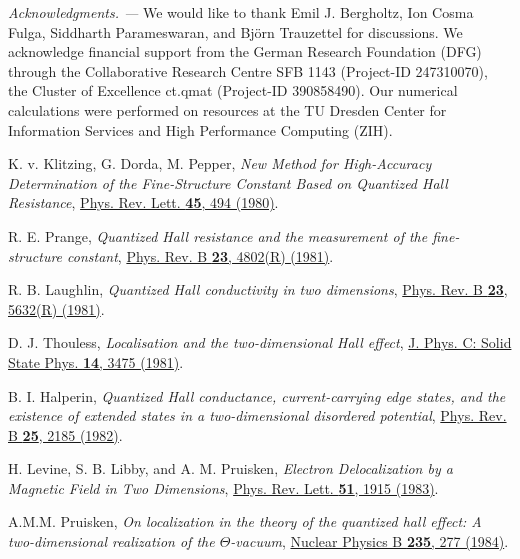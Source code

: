 \documentclass[aps,prl,amsmath,amssymb,twocolumn, superscriptaddress]{revtex4-2}
\begin{document}
{\it Acknowledgments. ---}
We would like to thank Emil J. Bergholtz, Ion Cosma Fulga, Siddharth Parameswaran, and Bj\"orn Trauzettel for discussions. We acknowledge financial support from the German Research Foundation (DFG) through the Collaborative Research Centre SFB 1143  (Project-ID 247310070), the Cluster of Excellence ct.qmat (Project-ID 390858490). Our numerical calculations were performed on resources at the TU Dresden Center for Information Services and High Performance Computing (ZIH).

\begin{thebibliography}{10}
K. v. Klitzing, G. Dorda, M. Pepper, {\em New Method for High-Accuracy Determination of the Fine-Structure Constant Based on Quantized Hall Resistance}, 
\href{https://journals.aps.org/prl/abstract/10.1103/PhysRevLett.45.494}{Phys. Rev. Lett. {\bfseries{45}}, 494 (1980)}.

R. E. Prange, {\em Quantized Hall resistance and the measurement of the fine-structure constant}, \href{https://journals.aps.org/prb/abstract/10.1103/PhysRevB.23.4802}{Phys. Rev. B {\bfseries 23}, 4802(R) (1981)}.

R. B. Laughlin, {\em Quantized Hall conductivity in two dimensions}, \href{https://journals.aps.org/prb/abstract/10.1103/PhysRevB.23.5632}{Phys. Rev. B {\bfseries 23}, 5632(R) (1981)}.

D. J. Thouless, {\em Localisation and the two-dimensional Hall effect}, \href{https://iopscience.iop.org/article/10.1088/0022-3719/14/23/022}{ J. Phys. C: Solid State Phys. {\bfseries 14}, 3475 (1981)}.

B. I. Halperin, {\em Quantized Hall conductance, current-carrying edge states, and the existence of extended states in a two-dimensional disordered potential}, \href{https://journals.aps.org/prb/abstract/10.1103/PhysRevB.25.2185}{Phys. Rev. B {\bfseries 25}, 2185 (1982)}.

H. Levine, S. B. Libby, and A. M. Pruisken, {\em Electron Delocalization by a Magnetic Field in Two Dimensions}, \href{https://journals.aps.org/prl/abstract/10.1103/PhysRevLett.51.1915}{Phys. Rev. Lett. {\bfseries 51}, 1915 (1983)}.

A.M.M. Pruisken, {\em On localization in the theory of the quantized hall effect: A two-dimensional realization of the $\Theta$-vacuum}, \href{https://www.sciencedirect.com/science/article/pii/0550321384901019}{Nuclear Physics B {\bfseries 235}, 277 (1984)}.


\end{thebibliography}
\end{document}
